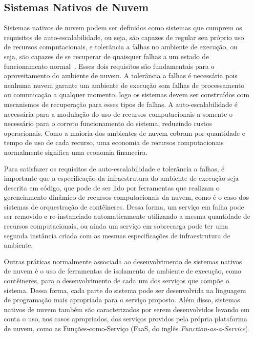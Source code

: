 

\subsection{Sistemas Nativos de Nuvem}
\label{sec:cloud-native-systems}
Sistemas nativos de nuvem podem ser definidos como sistemas que cumprem os requisitos de auto-escalabilidade, ou seja, são capazes de regular seu próprio uso de recursos computacionais, e tolerância a falhas no ambiente de execução, ou seja, são capazes de se recuperar de quaisquer falhas a um estado de funcionamento normal~\citep{garrison2017cloud,gilbert2018cloud}. Esses dois requisitos são fundamentais para o aproveitamento do ambiente de nuvem. A tolerância a falhas é necessária pois nenhuma nuvem garante um ambiente de execução sem falhas de processamento ou comunicação a qualquer momento, logo os sistemas devem ser construídos com mecanismos de recuperação para esses tipos de falhas. A auto-escalabilidade é necessária para a modulação do uso de recursos computacionais a somente o necessário para o correto funcionamento do sistema, reduzindo custos operacionais. Como a maioria dos ambientes de nuvem cobram por quantidade e tempo de uso de cada recurso, uma economia de recursos computacionais normalmente significa uma economia financeira.

Para satisfazer os requisitos de auto-escalabilidade e tolerância a falhas, é importante que a especificação da infraestrutura do ambiente de execução seja descrita em código, que pode de ser lido por ferramentas que realizam o gerenciamento dinâmico de recursos computacionais da nuvem, como é o caso dos sistemas de orquestração de contêineres. Dessa forma, um serviço em falha pode ser removido e re-instanciado automaticamente utilizando a mesma quantidade de recursos computacionais, ou ainda um serviço em sobrecarga pode ter uma segunda instância criada com as mesmas especificações de infraestrutura de ambiente. 

Outras práticas normalmente associada ao desenvolvimento de sistemas nativos de nuvem é o uso de ferramentas de isolamento de ambiente de execução, como contêineres, para o desenvolvimento de cada um dos serviços que compõe o sistema. Dessa forma, cada parte do sistema pode ser desenvolvida na linguagem de programação mais apropriada para o serviço proposto. Além disso, sistemas nativos de nuvem também são caracterizados por serem desenvolvidos levando em conta o uso, nos casos apropriados, dos serviços providos pela própria plataforma de nuvem, como as Funções-como-Serviço (FaaS, do inglês \textit{Function-as-a-Service}).




